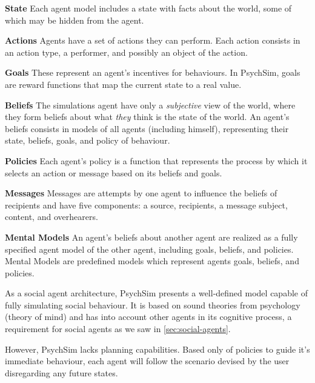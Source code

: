 \begin{description}
\item \textbf{State} Each agent model includes a state with facts about the world, some of which may be hidden from the agent.
\item \textbf{Actions} Agents have a set of actions they can perform. Each action consists in an action type, a performer, and possibly an object of the action.
\item \textbf{Goals} These represent an agent's incentives for behaviours. In PsychSim, goals are reward functions that map the current state to a real value.
\item \textbf{Beliefs} The simulations agent have only a \textit{subjective} view of the world, where they form beliefs about what \textit{they} think is the state of the world. An agent's beliefs consists in models of all agents (including himself), representing their state, beliefs, goals, and policy of behaviour.
\item \textbf{Policies} Each agent's policy is a function that represents the process by which it selects an action or message based on its beliefs and goals.
\item \textbf{Messages} Messages are attempts by one agent to influence the beliefs of recipients and have five components: a source, recipients, a message subject, content, and overhearers.
\item \textbf{Mental Models} An agent's beliefs about another agent are realized as a fully specified agent model of the other agent, including goals, beliefs, and policies. Mental Models are predefined models which represent agents goals, beliefs, and policies.
\end{description}

As a social agent architecture, PsychSim presents a well-defined model capable of fully simulating social behaviour.
It is based on sound theories from psychology (theory of mind) and has into account other agents in its cognitive process, a requirement for social agents as we saw in \ref{sec:social-agents}.

However, PsychSim lacks planning capabilities.
Based only of policies to guide it's immediate behaviour, each agent will follow the scenario devised by the user disregarding any future states.